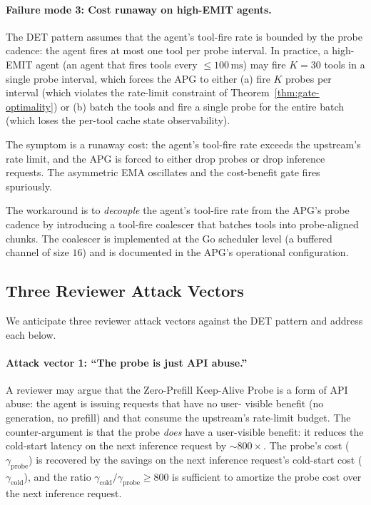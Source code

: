 \paragraph{Failure mode 3: Cost runaway on high-EMIT agents.}
The DET pattern assumes that the agent's tool-fire rate is bounded
by the probe cadence: the agent fires at most one tool per probe
interval. In practice, a high-EMIT agent (an agent that fires tools
every $\le 100\,\text{ms}$) may fire $K = 30$ tools in a single probe
interval, which forces the APG to either (a) fire $K$ probes per
interval (which violates the rate-limit constraint of
Theorem~\ref{thm:gate-optimality}) or (b) batch the tools and fire a
single probe for the entire batch (which loses the per-tool cache
state observability).

The symptom is a runaway cost: the agent's tool-fire rate exceeds
the upstream's rate limit, and the APG is forced to either drop
probes or drop inference requests. The asymmetric EMA oscillates and
the cost-benefit gate fires spuriously.

The workaround is to \emph{decouple} the agent's tool-fire rate
from the APG's probe cadence by introducing a tool-fire coalescer
that batches tools into probe-aligned chunks. The coalescer is
implemented at the Go scheduler level (a buffered channel of size
$16$) and is documented in the APG's operational configuration.

\subsection{Three Reviewer Attack Vectors}

We anticipate three reviewer attack vectors against the DET pattern
and address each below.

\paragraph{Attack vector 1: ``The probe is just API abuse.''}
A reviewer may argue that the Zero-Prefill Keep-Alive Probe is a
form of API abuse: the agent is issuing requests that have no user-
visible benefit (no generation, no prefill) and that consume the
upstream's rate-limit budget. The counter-argument is that the probe
\emph{does} have a user-visible benefit: it reduces the cold-start
latency on the next inference request by $\sim 800 \times$. The
probe's cost ($\gamma_{\text{probe}}$) is recovered by the savings
on the next inference request's cold-start cost ($\gamma_{\text{cold}}$),
and the ratio $\gamma_{\text{cold}} / \gamma_{\text{probe}} \ge 800$
is sufficient to amortize the probe cost over the next inference
request.

